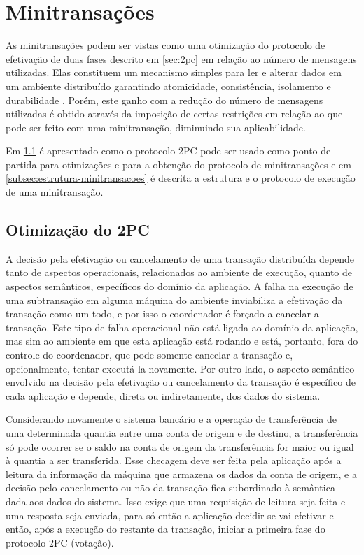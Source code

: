 \documentclass[11pt,twoside,a4paper]{book}
\begin{document}
\section{Minitransações}
\label{sec:minitransacoes}
As minitransações podem ser vistas como uma otimização do protocolo de efetivação de duas fases descrito em \ref{sec:2pc} em relação ao número de mensagens utilizadas. Elas constituem um mecanismo simples para ler e alterar dados em um ambiente distribuído garantindo atomicidade, consistência, isolamento e durabilidade \cite{sinfonia}. Porém, este ganho com a redução do número de mensagens utilizadas é obtido através da imposição de certas restrições em relação ao que pode ser feito com uma minitransação, diminuindo sua aplicabilidade.

Em \ref{subsec:derivando-minitransacoes} é apresentado como o protocolo 2PC pode ser usado como ponto de partida para otimizações e para a obtenção do protocolo de minitransações e em \ref{subsec:estrutura-minitransacoes} é descrita a estrutura e o protocolo de execução de uma minitransação.

\subsection{Otimização do 2PC}
\label{subsec:derivando-minitransacoes}
A decisão pela efetivação ou cancelamento de uma transação distribuída depende tanto de aspectos operacionais, relacionados ao ambiente de execução, quanto de aspectos semânticos, específicos do domínio da aplicação. A falha na execução de uma subtransação em alguma máquina do ambiente inviabiliza a efetivação da transação como um todo, e por isso o coordenador é forçado a cancelar a transação. Este tipo de falha operacional não está ligada ao domínio da aplicação, mas sim ao ambiente em que esta aplicação está rodando e está, portanto, fora do controle do coordenador, que pode somente cancelar a transação e, opcionalmente, tentar executá-la novamente. Por outro lado, o aspecto semântico envolvido na decisão pela efetivação ou cancelamento da transação é específico de cada aplicação e depende, direta ou indiretamente, dos dados do sistema.

Considerando novamente o sistema bancário e a operação de transferência de uma determinada quantia entre uma conta de origem e de destino, a transferência só pode ocorrer se o saldo na conta de origem da transferência for maior ou igual à quantia a ser transferida. Esse checagem deve ser feita pela aplicação após a leitura da informação da máquina que armazena os dados da conta de origem, e a decisão pelo cancelamento ou não da transação fica subordinado à semântica dada aos dados do sistema. Isso exige que uma requisição de leitura seja feita e uma resposta seja enviada, para só então a aplicação decidir se vai efetivar e então, após a execução do restante da transação, iniciar a primeira fase do protocolo 2PC (votação).
\end{document}
